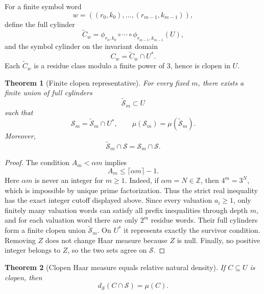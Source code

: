 \documentclass[11pt]{article}
\newtheorem{theorem}{Theorem}[section]
\theoremstyle{definition}
\theoremstyle{remark}
\newcommand{\Sset}{\mathcal S}
\newcommand{\Ustar}{U^\ast}
\newcommand{\ds}{d_{\Sset}}
\begin{document}
For a finite symbol word
\[
w=((r_0,k_0),\ldots,(r_{m-1},k_{m-1})),
\]
define the full cylinder
\begin{equation}
\widetilde C_w
=
\phi_{r_0,k_0}\circ\cdots\circ
\phi_{r_{m-1},k_{m-1}}(U),
\label{eq:full-cylinder-set}
\end{equation}
and the symbol cylinder on the invariant domain
\[
C_w=\widetilde C_w\cap\Ustar.
\]
Each $\widetilde C_w$ is a residue class modulo a finite power of $3$, hence is clopen in $U$.

\begin{theorem}[Finite clopen representative]
For every fixed $m$, there exists a finite union of full cylinders
\[
\widetilde{\mathcal S}_m\subset U
\]
such that
\begin{equation}
\mathcal S_m=\widetilde{\mathcal S}_m\cap\Ustar,
\qquad
\mu(\mathcal S_m)=\mu(\widetilde{\mathcal S}_m).
\label{eq:clopen-rep}
\end{equation}
Moreover,
\begin{equation}
\widetilde{\mathcal S}_m\cap\Sset
=
\mathcal S_m\cap\Sset.
\label{eq:integer-clopen}
\end{equation}
\end{theorem}

\begin{proof}
The condition $A_m<\alpha m$ implies
\[
A_m\le\lceil\alpha m\rceil-1.
\]
Here $\alpha m$ is never an integer for $m\ge1$.  Indeed, if
$\alpha m=N\in\mathbb Z$, then $4^m=3^N$, which is impossible by unique
prime factorization.  Thus the strict real inequality has the exact integer
cutoff displayed above.  Since every valuation $a_i\ge1$, only finitely many valuation words can satisfy all prefix inequalities through depth $m$, and for each valuation word there are only $2^m$ residue words.  Their full cylinders form a finite clopen union $\widetilde{\mathcal S}_m$.  On $\Ustar$ it represents exactly the survivor condition.  Removing $Z$ does not change Haar measure because $Z$ is null.  Finally, no positive integer belongs to $Z$, so the two sets agree on $\Sset$.
\end{proof}

\begin{theorem}[Clopen Haar measure equals relative natural density]
If $C\subseteq U$ is clopen, then
\begin{equation}
\boxed{\ds(C\cap\Sset)=\mu(C).}
\label{eq:clopen-density}
\end{equation}
\end{theorem}
\end{document}
